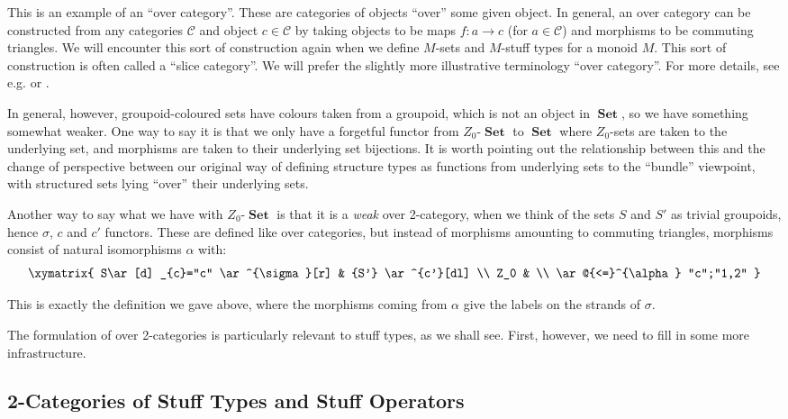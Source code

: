 \documentclass{amsart} \usepackage{amsmath,amssymb,bbm}
\newcommand{\opname}[1]{\operatorname{#1}}
\newcommand{\catname}[1]{\boldsymbol{\opname{{#1}}}}
\newcommand{\Set}{\catname{Set}}
\begin{document}
  This is an example of an ``over category''.  These are categories of
  objects ``over'' some given object.  In general, an over category
  can be constructed from any categories $\mathcal{C}$ and object $c
  \in \mathcal{C}$ by taking objects to be maps $f : a \rightarrow c$
  (for $a \in \mathcal{C}$) and morphisms to be commuting triangles.
  We will encounter this sort of construction again when we define
  $M$-sets and $M$-stuff types for a monoid $M$.  This sort of
  construction is often called a ``slice category''.  We will prefer
  the slightly more illustrative terminology ``over category''.  For
  more details, see e.g. \cite{maclane} or \cite{macmoer}.

  In general, however, groupoid-coloured sets have colours taken from
  a groupoid, which is not an object in $\catname{Set}$, so we have
  something somewhat weaker.  One way to say it is that we only have a
  forgetful functor from $Z_0$-$\catname{Set}$ to $\catname{Set}$
  where $Z_0$-sets are taken to the underlying set, and morphisms are
  taken to their underlying set bijections.  It is worth pointing out
  the relationship between this and the change of perspective between
  our original way of defining structure types as functions from
  underlying sets to the ``bundle'' viewpoint, with structured sets
  lying ``over'' their underlying sets.

  Another way to say what we have with $Z_0$-$\Set$ is that it is a
  \textit{weak} over 2-category, when we think of the sets $S$ and
  $S'$ as trivial groupoids, hence $\sigma$, $c$ and $c'$ functors.
  These are defined like over categories, but instead of morphisms
  amounting to commuting triangles, morphisms consist of natural
  isomorphisms $\alpha$ with: \begin{equation}
    \xymatrix{     
      S\ar[d] _{c}="c" \ar^{\sigma}[r] & {S'} \ar^{c'}[dl] \\ 
      Z_0 & \\ 
      \ar@{<=}^{\alpha} "c";"1,2" 
    } 
  \end{equation}

  This is exactly the definition we gave above, where the morphisms
  coming from $\alpha$ give the labels on the strands of $\sigma$.

  The formulation of over 2-categories is particularly relevant to
  stuff types, as we shall see.  First, however, we need to fill in
  some more infrastructure.

\subsection{2-Categories of Stuff Types and Stuff Operators}\label{sec:2cat}
\end{document}
